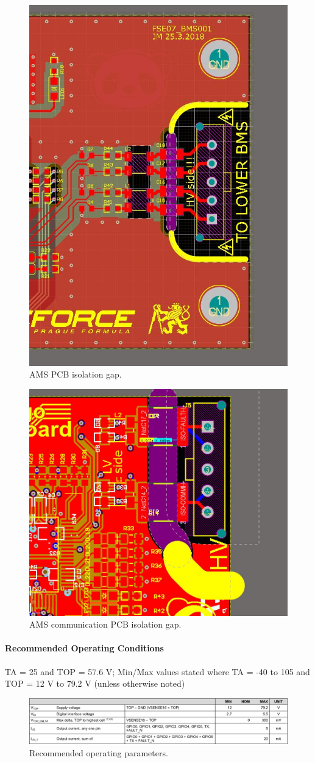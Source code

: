\begin{figure}[H]
	\centering
	\includegraphics[width=.5\textwidth]{./img/pcb_BMS.jpg}
	\caption{AMS PCB isolation gap.}
	\label{fig:ams-pcb-isolation-gap}
\end{figure}
\begin{figure}[H]
	\centering
	\includegraphics[width=.5\textwidth]{./img/pcb_prevodnik.jpg}
	\caption{AMS communication PCB isolation gap.}
	\label{fig:ams-com-pcb-isolation-gap}
\end{figure}

\paragraph{Recommended Operating Conditions}
TA = 25 \degC and TOP = 57.6 V; Min/Max values stated where TA = -40 \degC to 105 \degC and TOP = 12 V to 79.2 V (unless otherwise noted)
\begin{figure}[H]
	\centering
	\includegraphics[width=\textwidth]{./img/BMS-operatingparms.pdf}
	\caption{Recommended operating parameters.}
	\label{fig:BMS-op-params}
\end{figure}


